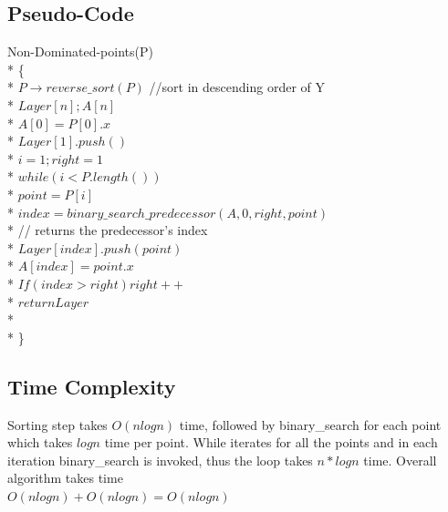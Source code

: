 \documentclass{article}
\begin{document}
\subsection{Pseudo-Code}
Non-Dominated-points(P)	\\*
\{			\\*
    \hspace*{1cm}$ P  \longrightarrow  reverse\_sort(P)$ //sort in descending order of Y  \\*
    \hspace*{1cm} $ Layer[n]; A[n] $\\*
    \hspace*{1cm} $ A[0]=P[0].x $\\*
    \hspace*{1cm} $Layer[1].push()$ \\*
	\hspace*{1cm} $i=1; right=1 $\\*
    \hspace*{1cm} $while(i < P.length())$\\*
    \hspace*{2cm} $point = P[i]$\\*
    \hspace*{2cm} $index = binary\_search\_predecessor(A, 0, right, point)$ \\*
    \hspace*{4cm}                // returns the predecessor's index \\*
    \hspace*{2cm} $Layer[index].push(point)$\\*
    \hspace*{2cm} $A[index] = point.x$\\*
    \hspace*{2cm} $If (index > right ) right++ $\\*
	\hspace*{1cm} $return  Layer $\\*
	\\*
\}
\subsection{Time Complexity}
  Sorting step takes $O(nlogn)$ time, followed by binary\_search for each point which takes $ logn $ time per point.
  While iterates for all the points and in each iteration binary\_search is invoked, thus the loop takes $ n*logn $ time.
  Overall algorithm takes time \\
             $O(nlogn) + O(nlogn) = O(nlogn) $
\end{document}
